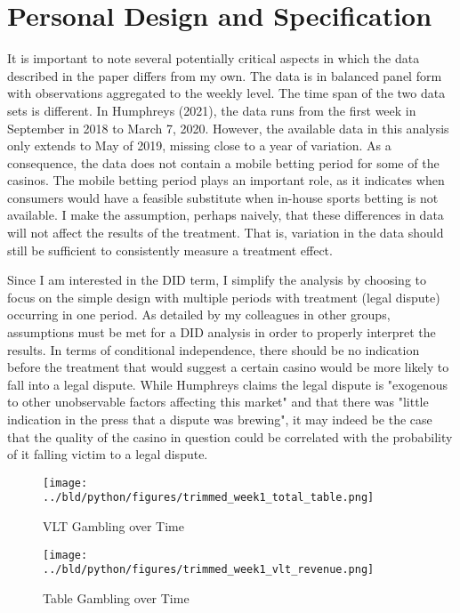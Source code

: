 \documentclass{article}
\begin{document}
\section*{Personal Design and Specification}

It is important to note several potentially critical aspects in which the data described in the paper differs from my own. The data is in balanced panel form with observations aggregated to the weekly level. The time span of the two data sets is different. In Humphreys (2021\cite{Humphreys2021}), the data runs from the first week in September in 2018 to March 7, 2020. However, the available data in this analysis only extends to May of 2019, missing close to a year of variation. As a consequence, the data does not contain a mobile betting period for some of the casinos. The mobile betting period plays an important role, as it indicates when consumers would have a feasible substitute when in-house sports betting is not available. I make the assumption, perhaps naively, that these differences in data will not affect the results of the treatment. That is, variation in the data should still be sufficient to consistently measure a treatment effect.

Since I am interested in the DID term, I simplify the analysis by choosing to focus on the simple design with multiple periods with treatment (legal dispute) occurring in one period. As detailed by my colleagues in other groups, assumptions must be met for a DID analysis in order to properly interpret the results. In terms of conditional independence, there should be no indication before the treatment that would suggest a certain casino would be more likely to fall into a legal dispute. While Humphreys claims the legal dispute is "exogenous to other unobservable factors affecting this market" and that there was "little indication in the press that a dispute was brewing"\cite{Humphreys2021}, it may indeed be the case that the quality of the casino in question could be correlated with the probability of it falling victim to a legal dispute.

\begin{figure}[t]
\caption{VLT Gambling over Time}
\texttt{[image: ../bld/python/figures/trimmed\_week1\_total\_table.png]}
\centering
\label{fig:vlt}
\end{figure}

\begin{figure}[t]
\caption{Table Gambling over Time}
\texttt{[image: ../bld/python/figures/trimmed\_week1\_vlt\_revenue.png]}
\centering
\label{fig:table}
\end{figure}
\end{document}

